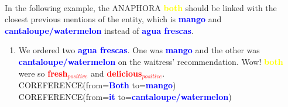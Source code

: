 \documentclass{article}
\begin{document}
\paragraph{}
In the following example, the ANAPHORA \textbf{\textcolor{yellow}{both}} should be linked with the closest previous mentions of the entity, which is \textbf{\textcolor{blue}{mango}} and \textbf{\textcolor{blue}{cantaloupe/watermelon}} instead of \textbf{\textcolor{blue}{agua frescas}}.

\begin{enumerate}[resume]
	\item We ordered two \textbf{\textcolor{blue}{agua frescas}}. One was  \textbf{\textcolor{blue}{mango}} and the other was 
	\textbf{\textcolor{blue}{cantaloupe/watermelon}} on the waitress' recommendation. Wow! 
	\textbf{\textcolor{yellow}{both}} were so 
	\textbf{\textcolor{red}{fresh$_{positive}$}} and 
	\textbf{\textcolor{red}{delicious$_{positive}$}}.\\
	\textsc{COREFERENCE}(from=\textbf{\textcolor{blue}{Both}} to=\textbf{\textcolor{blue}{mango}}) \\
	\textsc{COREFERENCE}(from=\textbf{\textcolor{blue}{it}} to=\textbf{\textcolor{blue}{cantaloupe/watermelon}}) \\
	
\end{enumerate}
\end{document}
